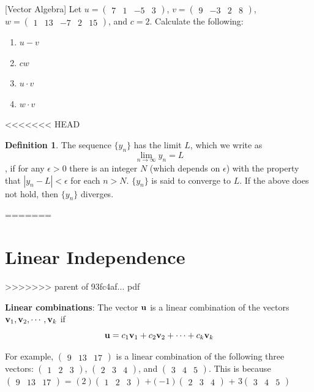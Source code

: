 \documentclass[]{book}
\theoremstyle{definition}
\newtheorem{definition}{Definition}[chapter]
\theoremstyle{definition}
\theoremstyle{definition}
\theoremstyle{remark}
\begin{document}
[Vector Algebra]
\protect\hypertarget{exr:vectors1}{}{\label{exr:vectors1} {} }
Let \(u = \begin{pmatrix} 7&1&-5&3\end{pmatrix}\), \(v = \begin{pmatrix} 9&-3&2&8 \end{pmatrix}\), \(w = \begin{pmatrix} 1&13& -7&2 &15 \end{pmatrix}\), and \(c = 2\). Calculate the following:

\begin{enumerate}
\def\labelenumi{\arabic{enumi}.}
\item
  \(u-v\)
\item
  \(cw\)
\item
  \(u \cdot v\)
\item
  \(w \cdot v\)
\end{enumerate}

<<<<<<< HEAD
\begin{definition}
\protect\hypertarget{def:unnamed-chunk-2}{}{\label{def:unnamed-chunk-2} }The sequence \(\{y_n\}\) has the limit \(L\), which we write as \[\lim\limits_{n \to \infty} y_n =L\], if for any \(\epsilon>0\) there is an integer \(N\) (which depends on \(\epsilon\)) with the property that \(|y_n -L|<\epsilon\) for each \(n>N\). \(\{y_n\}\) is said to converge to \(L\). If the above does not hold, then \(\{y_n\}\) diverges.
\end{definition}
=======
\hypertarget{linearindependence}{%
\section{Linear Independence}\label{linearindependence}}
>>>>>>> parent of 93fc4af... pdf

\textbf{Linear combinations}: The vector \({\bf u}\) is a linear combination of the vectors \({\bf v}_1, {\bf v}_2, \cdots , {\bf v}_k\) if
\[{\bf u} = c_1{\bf v}_1 + c_2{\bf v}_2 +  \cdots + c_k{\bf v}_k\]

For example, \(\begin{pmatrix}9 & 13 & 17 \end{pmatrix}\) is a linear combination of the following three vectors: \(\begin{pmatrix}1 & 2 & 3 \end{pmatrix}\), \(\begin{pmatrix} 2 & 3& 4\end{pmatrix}\), and \(\begin{pmatrix} 3 & 4 & 5 \end{pmatrix}\). This is because \(\begin{pmatrix}9 & 13 & 17 \end{pmatrix}\) = \((2)\begin{pmatrix}1 & 2 & 3 \end{pmatrix}\) \(+ (-1)\begin{pmatrix} 2 & 3& 4\end{pmatrix}\) + \(3\begin{pmatrix} 3 & 4 & 5 \end{pmatrix}\)
\end{document}
